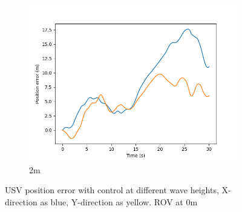 \documentclass[class=article, crop=false]{standalone}
\begin{document}
\begin{figure}
\begin{subfigure}[b]{0.48\textwidth}
        \centering
        \includegraphics{scenario1/rov-0m/2.0m/usv_pos_error_controlled}
        \caption{2m}
        \label{}
    \end{subfigure}
    \caption{USV position error with control at different wave heights, X-direction as blue, Y-direction as yellow. ROV at 0m}
    \label{}
\end{figure}
\end{document}

